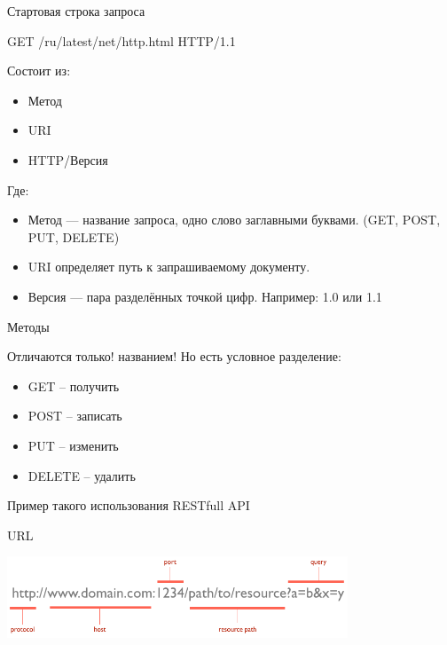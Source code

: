\begin{frame}{Стартовая строка запроса}

    GET /ru/latest/net/http.html HTTP/1.1

    Состоит из:
    \begin{itemize}
        \item Метод
        \item URI
        \item HTTP/Версия
    \end{itemize}

    Где:

    \begin{itemize}
        \item Метод — название запроса, одно слово заглавными
            буквами. (GET, POST, PUT, DELETE)
        \item URI определяет путь к запрашиваемому документу.
        \item Версия — пара разделённых точкой цифр. \newline
            Например: 1.0 или 1.1
    \end{itemize}

\end{frame}

\begin{frame}{Методы}

    Отличаются только! названием! \newline
    Но есть условное разделение:

    \begin{itemize}
        \item GET \--- получить
        \item POST \--- записать
        \item PUT \--- изменить
        \item DELETE \--- удалить
    \end{itemize}

    Пример такого использования RESTfull API

\end{frame}

\begin{frame}{URL}
    \begin{center}
        \includegraphics[width=4in]{media/url-structure.png}
    \end{center}
\end{frame}

